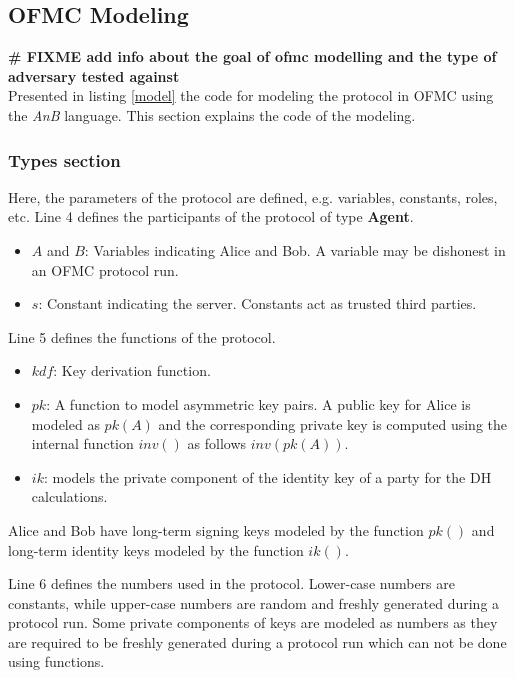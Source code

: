 \subsection{OFMC Modeling}
\textbf{\LARGE \# FIXME add info about the goal of ofmc modelling and the type of adversary tested against}\\

Presented in listing \ref{model} the code for modeling the protocol in OFMC using the \textit{AnB} language. This section explains the code of the modeling.


\subsubsection{Types section} 
Here, the parameters of the protocol are defined, e.g. variables, constants, roles, etc. Line 4 defines the participants of the protocol of type \textbf{Agent}.
\begin{itemize}
	\item $A$ and $B$: Variables indicating Alice and Bob. A variable may be dishonest in an OFMC protocol run.
	\item $s$: Constant indicating the server. Constants act as trusted third parties.
\end{itemize}
\par
Line 5 defines the functions of the protocol.
\begin{itemize}
	\item $kdf$: Key derivation function.
	\item $pk$: A function to model asymmetric key pairs. A public key for Alice is modeled as $pk(A)$ and the corresponding private key is computed using the internal function $inv()$ as follows $inv(pk(A))$.
	\item $ik$: models the private component of the identity key of a party for the DH calculations.
\end{itemize}
	Alice and Bob have long-term signing keys modeled by the function $pk()$ and long-term identity keys modeled by the function $ik()$.
	\par
Line 6 defines the numbers used in the protocol. Lower-case numbers are constants, while upper-case numbers are random and freshly generated during a protocol run. Some private components of keys are modeled as numbers as they are required to be freshly generated during a protocol run which can not be done using functions.
